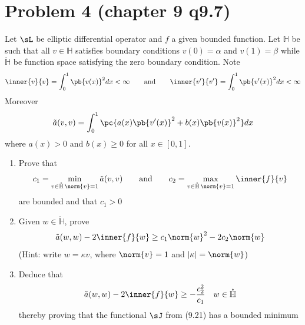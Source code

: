 \documentclass[11pt]{article}
\begin{document}
\newpage
\section*{Problem 4 (chapter 9 q9.7)}
Let $\sL$ be elliptic differential operator and $f$ a given bounded function. Let $\mathbb{H}$ be such that all $v\in \mathbb{H}$ satisfies boundary conditions $v(0)=\alpha$ and $v(1) = \beta$ while $\mathring{\mathbb{H}}$ be function space satisfying the zero boundary condition. Note
\[
    \inner{v}{v} = \int_0^1 \pb{v(x)}^2 dx < \infty 
    \quad \quad \text{and} \quad \quad
    \inner{v'}{v'} = \int_0^1 \pb{v'(x)}^2 dx < \infty
\]
Moreover 
\[
    \ta(v,v) = \int_0^1 \pc{
        a(x) \pb{v'(x)}^2 + b(x) \pb{v(x)}^2
    }dx
\]
where $a(x) > 0$ and $b(x)\geq 0$ for all $x\in[0,1]$.
\begin{enumerate}
    \item Prove that 
    \[
        c_1 = \min_{v\in\mathring{\mathbb{H}} \, \norm{v}=1} \ta(v,v)
        \quad \quad \text{and} \quad \quad
        c_2 = \max_{v\in\mathring{\mathbb{H}} \, \norm{v}=1} \inner{f}{v}
    \]
    are bounded and that $c_1 > 0$
    \item Given $w\in \mathring{\mathbb{H}}$, prove 
    \[
        \ta(w,w) - 2\inner{f}{w} \geq c_1 \norm{w}^2 - 2c_2 \norm{w} 
    \]
    (Hint: write $w=\kappa v$, where $\norm{v}=1$ and $\abs{\kappa} = \norm{w}$)
    \item Deduce that 
    \[
        \ta(w,w) - 2\inner{f}{w} \geq -\frac{c_2^2}{c_1}
        \quad w\in \mathring{\mathbb{H}}
    \]
    thereby proving that the functional $\sJ$ from (9.21) has a bounded minimum
\end{enumerate}
\end{document}
